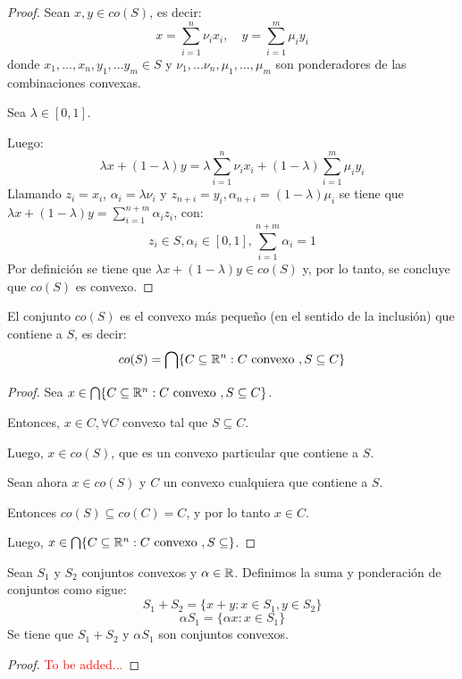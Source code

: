 \begin{proof}
	Sean $x,y \in co(S)$, es decir: 
	$$ x = \sum_{i=1}^n \nu_i x_i , \quad y = \sum_{i=1}^m \mu_i y_i $$
	donde $x_1, ... , x_n, y_1, ... y_m \in S$ y $\nu_1, ... \nu_n, \mu_1, ... , \mu_m$ son ponderadores de las combinaciones convexas.  
	
	Sea $\lambda \in [0,1]$.   
	
	Luego: 
	$$\lambda x + (1 - \lambda)y = \lambda \sum_{i=1}^n  \nu_i x_i + (1 - \lambda) \sum_{i=1}^m \mu_i y_i $$  
	Llamando $z_i = x_i$, $\alpha_i = \lambda \nu_i$ y $z_{n+i} = y_i , \alpha_{n+i} = (1-\lambda)\mu_i$ se tiene que $\lambda x + ( 1 - \lambda) y = \sum_{i=1}^{n+m} \alpha _i z_i $, con: 
	$$ z_i \in S, \alpha_i \in [0,1], \sum_{i=1}^{n+m} \alpha_i = 1 $$  
	Por definición se tiene que $\lambda x + ( 1 - \lambda ) y \in co (S)$ y, por lo tanto, se concluye que $co(S)$ es convexo.  
\end{proof}


\begin{proposicion}
	El conjunto $co(S)$ es el convexo más pequeño (en el sentido de la inclusión) que contiene a $S$, es decir: 
	$$ co(S) = \bigcap \{ C \subseteq \mathbb{R}^n : C \text{  convexo }, S \subseteq C\} $$
\end{proposicion}

\begin{proof}
	Sea $x \in  \bigcap \{ C \subseteq \mathbb{R}^n : C \text{  convexo }, S \subseteq C\}$.   
	
	Entonces, $x \in C, \forall C $ convexo tal que $S \subseteq C$.   
	
	Luego, $x \in co(S)$, que es un convexo particular que contiene a $S$.  
	
	Sean ahora $x \in co(S) $ y $C$ un convexo cualquiera que contiene a $S$.   
	
	Entonces $co (S) \subseteq co (C) = C$, y por lo tanto $x \in C$.   
	
	Luego, $x \in  \bigcap \{ C \subseteq \mathbb{R}^n : C \text{  convexo }, S \subseteq \}$.   
\end{proof}

\begin{proposicion}
	Sean $S_1$ y $S_2$ conjuntos convexos y $\alpha \in \mathbb{R}$. Definimos la suma y ponderación de conjuntos como sigue: 
	$$ S_1 + S_2 = \{ x + y : x \in S_1, y \in S_2 \} $$ 
	$$ \alpha S_1 = \{ \alpha x : x \in S_1 \} $$  
	Se tiene que $S_1 + S_2$ y $\alpha S_1$ son conjuntos convexos. 
\end{proposicion}


\begin{proof}
	\textcolor{red}{To be added...}
\end{proof}